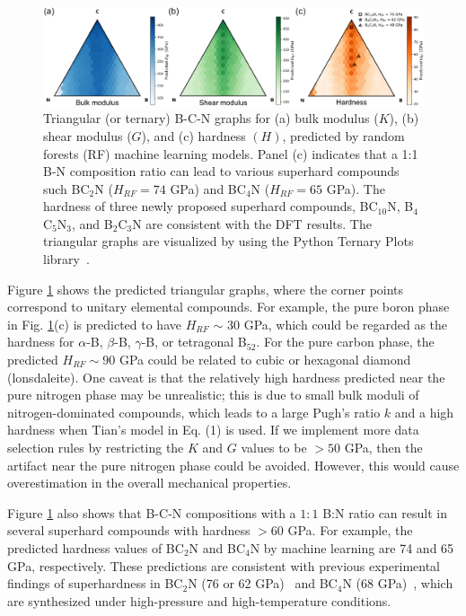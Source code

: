 	\begin{figure}[htbp]
        \centering
        \captionsetup{singlelinecheck = false, justification=justified}
        \includegraphics[width=1.0\textwidth]{BCN_4_prediction.png}
        \caption[B-C-N triangular plots for bulk modulus, shear modulus, and hardness]{Triangular (or ternary) B-C-N graphs for (a) bulk modulus ($K$), (b) shear modulus ($G$), and (c) hardness $(H)$, predicted by random forests (RF) machine learning models. Panel (c) indicates that a 1:1 B-N composition ratio can lead to various superhard compounds such BC$_2$N ($H_{RF} = 74$ GPa) and BC$_4$N ($H_{RF}=65$ GPa). The hardness of three newly proposed superhard compounds, BC$_{10}$N, B$_4$C$_5$N$_3$, and B$_2$C$_3$N are consistent with the DFT results. The triangular graphs are visualized by using the Python Ternary Plots library~\cite{pythonternary}.}
        \label{BCN_4_prediction}
    \end{figure}

	Figure \ref{BCN_4_prediction} shows the predicted triangular graphs,
	where the corner points correspond to unitary elemental compounds.
	For example, the pure boron phase in Fig. \ref{BCN_4_prediction}(c) is predicted to have $H_{RF}$ $\sim$ 30 GPa, which could be regarded as the hardness for $\alpha$-B, $\beta$-B, $\gamma$-B, or tetragonal B$_{52}$. For the pure carbon phase, the predicted $H_{RF} \sim 90$ GPa could be related to cubic or hexagonal diamond (lonsdaleite).
	One caveat is that the relatively high hardness predicted near the pure nitrogen phase may be unrealistic; this is due to small bulk moduli of nitrogen-dominated compounds, which leads to a large Pugh's ratio $k$ and a high hardness when Tian's model in Eq. (1) is used. If we implement more data selection rules by restricting the $K$ and $G$ values to be $>50$ GPa, then the artifact near the pure nitrogen phase could be avoided. However, this would cause overestimation in the overall mechanical properties.
	
	Figure \ref{BCN_4_prediction} also shows that B-C-N compositions with a $1:1$ B:N ratio can result in several superhard compounds with hardness $>60$ GPa. For example, the predicted hardness values of BC$_2$N and BC$_4$N by machine learning are 74 and 65 GPa, respectively. These predictions are consistent with previous experimental findings of superhardness in BC$_2$N (76 or 62 GPa)~\cite{solozhenko2001mechanical,BC2N_solozhenko2001synthesis,BC2N_zhao2002superhard} and BC$_4$N (68 GPa)~\cite{BC2N_zhao2002superhard}, which are synthesized under high-pressure and high-temperature conditions. 
    
